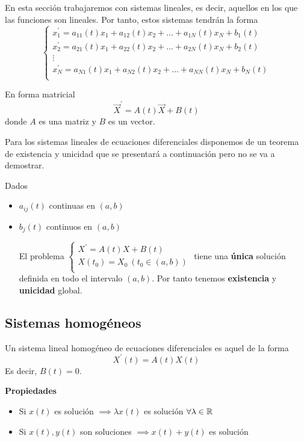 \documentclass{mathnotes}
\begin{document}
En esta sección trabajaremos con sistemas lineales, es decir, aquellos en los que las funciones son lineales. Por tanto, estos sistemas tendrán la forma
\begin{equation*}
  \left\lbrace
  \begin{array}{l}
     x_1^\prime = a_{11}(t)x_1+a_{12}(t)x_2+\hdots+a_{1N}(t)x_N+b_1(t)\\
     x_2^\prime = a_{21}(t)x_1+a_{22}(t)x_2+\hdots+a_{2N}(t)x_N+b_2(t)\\
     \vdots\\
     x_N^\prime = a_{N1}(t)x_1+a_{N2}(t)x_2+\hdots+a_{NN}(t)x_N+b_N(t)\\
  \end{array}
  \right.
\end{equation*}

En forma matricial
$$\vec{X}^\prime = A(t)\vec{X}+B(t)$$ donde $A$ es una matriz y $B$ es un vector.

Para los sistemas lineales de ecuaciones diferenciales disponemos de un teorema de existencia y unicidad que se presentará a continuación pero no se va a demostrar.

\begin{theorem}
Dados
\begin{itemize}
\item $a_{ij}(t)$ continuas en $(a,b)$
\item $b_j(t)$ continuos en $(a,b)$

El problema $
  \left\lbrace
  \begin{array}{l}
     X^\prime = A(t)X+B(t)\\
     X(t_0) = X_0\ (t_0\in(a,b))\\
  \end{array}
  \right.
$
tiene una \textbf{única} solución definida en todo el intervalo $(a,b)$. Por tanto tenemos \textbf{existencia} y \textbf{unicidad} global.
\end{itemize}
\end{theorem}

\subsection{Sistemas homogéneos}
\begin{definition}
Un sistema lineal homogéneo de ecuaciones diferenciales es aquel de la forma $$X^\prime(t) = A(t)X(t)$$ Es decir, $B(t) = 0$.
\end{definition}
\noindent\textbf{Propiedades}
\begin{itemize}
\item Si $x(t)$ es solución $\implies \lambda x(t)$ es solución $\forall \lambda \in \mathbb{R}$ 
\item Si $x(t), y(t)$ son soluciones $\implies x(t)+y(t)$ es solución
\end{itemize}
\end{document}
